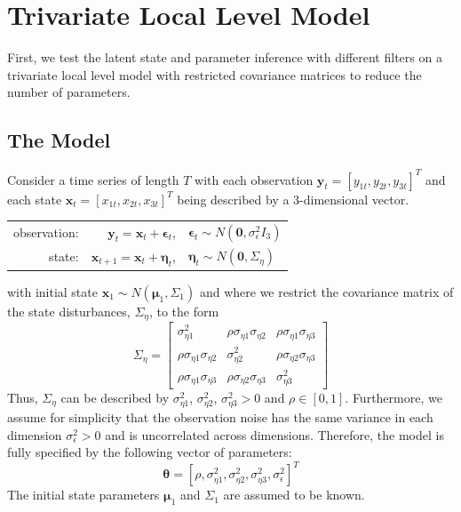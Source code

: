 \documentclass[11pt, oneside]{scrreprt}   	%
\begin{document}
\section{Trivariate Local Level Model}
First, we test the latent state and parameter inference with different filters on a trivariate local level model with restricted covariance matrices to reduce the number of parameters. 

\subsection{The Model}
Consider a time series of length $T$ with each observation $\boldsymbol{y}_t=[y_{1t}, y_{2t}, y_{3t}]^T$ and each state $\boldsymbol{x}_t=[x_{1t}, x_{2t}, x_{3t}]^T$ being described by a 3-dimensional vector.

\bigskip
\begin{center}
\begin{tabular}{ r r l }
  observation: & $\boldsymbol{y}_t = \boldsymbol{x}_t + \boldsymbol{\epsilon}_t$, & $\boldsymbol{\epsilon}_t \sim N(\textbf{0}, \sigma_{\epsilon}^2 I_3)$ \\
  state: & $\boldsymbol{x}_{t+1} = \boldsymbol{x}_t + \boldsymbol{\eta}_t$, & $\boldsymbol{\eta}_t \sim N(\textbf{0}, \Sigma_{\eta})$ \\
\end{tabular}
\end{center}
\bigskip
with initial state $\boldsymbol{x}_1 \sim N(\boldsymbol{\mu}_1, \Sigma_1)$ and where we restrict the covariance matrix of the state disturbances, $\Sigma_{\eta}$, to the form
$$
\Sigma_{\eta} = 
\begin{bmatrix}
\sigma_{\eta 1}^2 & \rho \sigma_{\eta 1} \sigma_{\eta 2} & \rho \sigma_{\eta 1} \sigma_{\eta 3}
\\ \rho \sigma_{\eta 1} \sigma_{\eta 2} & \sigma_{\eta 2}^2 & \rho \sigma_{\eta 2} \sigma_{\eta 3}
\\ \rho \sigma_{\eta 1} \sigma_{\eta 3} & \rho \sigma_{\eta 2} \sigma_{\eta 3} & \sigma_{\eta 3}^2
\end{bmatrix}
$$
Thus, $\Sigma_{\eta}$ can be described by $\sigma_{\eta 1}^2$, $\sigma_{\eta 2}^2$, $\sigma_{\eta 3}^2 > 0$ and $\rho \in [0,1]$. Furthermore, we assume for simplicity that the observation noise has the same variance in each dimension $\sigma_{\epsilon}^2 > 0$ and is uncorrelated across dimensions. Therefore, the model is fully specified by the following vector of parameters:
$$
\boldsymbol{\theta} = [\rho, \sigma_{\eta 1}^2, \sigma_{\eta 2}^2, \sigma_{\eta 3}^2, \sigma_{\epsilon}^2]^T
$$
The initial state parameters $\boldsymbol{\mu}_1$ and $\Sigma_1$ are assumed to be known.
\end{document}
